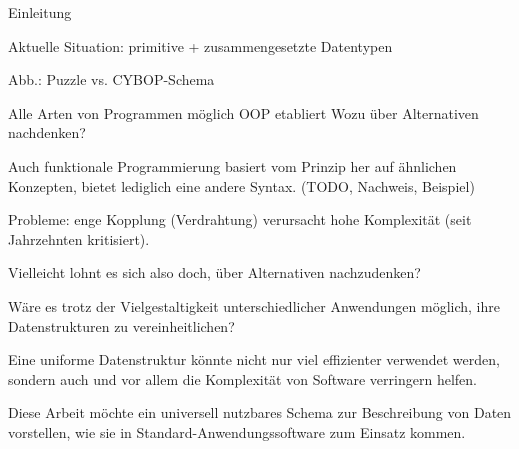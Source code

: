 
Einleitung

Aktuelle Situation: primitive + zusammengesetzte Datentypen

Abb.: Puzzle vs. CYBOP-Schema

Alle Arten von Programmen möglich
OOP etabliert
Wozu über Alternativen nachdenken?

Auch funktionale Programmierung basiert vom Prinzip her
auf ähnlichen Konzepten, bietet lediglich eine andere Syntax.
(TODO, Nachweis, Beispiel)

Probleme: enge Kopplung (Verdrahtung) verursacht hohe Komplexität
(seit Jahrzehnten kritisiert).

Vielleicht lohnt es sich also doch, über Alternativen nachzudenken?

Wäre es trotz der Vielgestaltigkeit unterschiedlicher Anwendungen möglich,
ihre Datenstrukturen zu vereinheitlichen?

Eine uniforme Datenstruktur könnte nicht nur viel effizienter verwendet werden,
sondern auch und vor allem die Komplexität von Software verringern helfen.

Diese Arbeit möchte ein universell nutzbares Schema zur Beschreibung
von Daten vorstellen, wie sie in Standard-Anwendungssoftware zum
Einsatz kommen.
